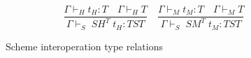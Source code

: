 \begin{figure}
\[
\frac{\Gamma\vdash_{H}t_{H}:T\quad\Gamma\vdash_{H}T}{\Gamma\vdash_{S}\;SH^{T}\;t_{H}:TST}
\quad
\frac{\Gamma\vdash_{M}t_{M}:T\quad\Gamma\vdash_{M}T}{\Gamma\vdash_{S}\;SM^{T}\;t_{M}:TST}
\]
\caption{Scheme interoperation type relations}
\label{sitr}
\end{figure}
